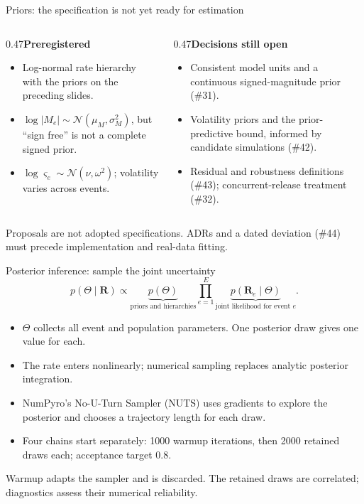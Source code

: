 \documentclass[aspectratio=169,11pt]{beamer}
\newcommand{\source}[1]{\par\vfill{\scriptsize\color{muted}#1}\par}
\newcommand{\heading}[1]{{\bfseries #1}\par\vspace{0.4em}}
\begin{document}
\begin{frame}{Priors: the specification is not yet ready for estimation}
\begin{columns}[T,onlytextwidth]
\begin{column}{0.47\textwidth}\heading{Preregistered}
\begin{itemize}
\item Log-normal rate hierarchy with the priors on the preceding slides.
\item $\log|M_e|\sim\mathcal N(\mu_M,\sigma_M^2)$, but ``sign free'' is not a complete signed prior.
\item $\log\varsigma_e\sim\mathcal N(\nu,\omega^2)$; volatility varies across events.
\end{itemize}\end{column}
\begin{column}{0.47\textwidth}\heading{Decisions still open}
\begin{itemize}
\item Consistent model units and a continuous signed-magnitude prior (\#31).
\item Volatility priors and the prior-predictive bound, informed by candidate simulations (\#42).
\item Residual and robustness definitions (\#43); concurrent-release treatment (\#32).
\end{itemize}\end{column}\end{columns}
\source{Proposals are not adopted specifications. ADRs and a dated deviation (\#44) must precede implementation and real-data fitting.}
\end{frame}

\begin{frame}{Posterior inference: sample the joint uncertainty}
\[p(\Theta\mid\mathbf R)\propto
\underbrace{p(\Theta)}_{\text{priors and hierarchies}}
\prod_{e=1}^E\underbrace{p(\mathbf R_e\mid\Theta)}_{\text{joint likelihood for event }e}.\]
\begin{itemize}
\item $\Theta$ collects all event and population parameters. One posterior draw gives one value for each.
\item The rate enters nonlinearly; numerical sampling replaces analytic posterior integration.
\item NumPyro's No-U-Turn Sampler (NUTS) uses gradients to explore the posterior and chooses a trajectory length for each draw.
\item Four chains start separately: 1000 warmup iterations, then 2000 retained draws each; acceptance target 0.8.
\end{itemize}
\source{Warmup adapts the sampler and is discarded. The retained draws are correlated; diagnostics assess their numerical reliability.}
\end{frame}
\end{document}

